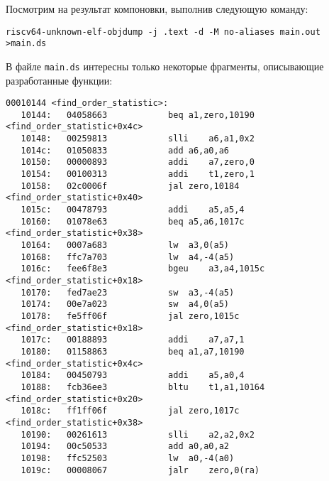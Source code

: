     Посмотрим на результат компоновки, выполнив следующую команду:
    \begin{Verbatim}[breaklines=true]
riscv64-unknown-elf-objdump -j .text -d -M no-aliases main.out >main.ds
    \end{Verbatim}
    В файле \verb|main.ds| интересны только некоторые фрагменты, описывающие разработанные функции:
    \begin{Verbatim}[breaklines=true]
00010144 <find_order_statistic>:
   10144:	04058663          	beq	a1,zero,10190 <find_order_statistic+0x4c>
   10148:	00259813          	slli	a6,a1,0x2
   1014c:	01050833          	add	a6,a0,a6
   10150:	00000893          	addi	a7,zero,0
   10154:	00100313          	addi	t1,zero,1
   10158:	02c0006f          	jal	zero,10184 <find_order_statistic+0x40>
   1015c:	00478793          	addi	a5,a5,4
   10160:	01078e63          	beq	a5,a6,1017c <find_order_statistic+0x38>
   10164:	0007a683          	lw	a3,0(a5)
   10168:	ffc7a703          	lw	a4,-4(a5)
   1016c:	fee6f8e3          	bgeu	a3,a4,1015c <find_order_statistic+0x18>
   10170:	fed7ae23          	sw	a3,-4(a5)
   10174:	00e7a023          	sw	a4,0(a5)
   10178:	fe5ff06f          	jal	zero,1015c <find_order_statistic+0x18>
   1017c:	00188893          	addi	a7,a7,1
   10180:	01158863          	beq	a1,a7,10190 <find_order_statistic+0x4c>
   10184:	00450793          	addi	a5,a0,4
   10188:	fcb36ee3          	bltu	t1,a1,10164 <find_order_statistic+0x20>
   1018c:	ff1ff06f          	jal	zero,1017c <find_order_statistic+0x38>
   10190:	00261613          	slli	a2,a2,0x2
   10194:	00c50533          	add	a0,a0,a2
   10198:	ffc52503          	lw	a0,-4(a0)
   1019c:	00008067          	jalr	zero,0(ra)


\end{Verbatim}
